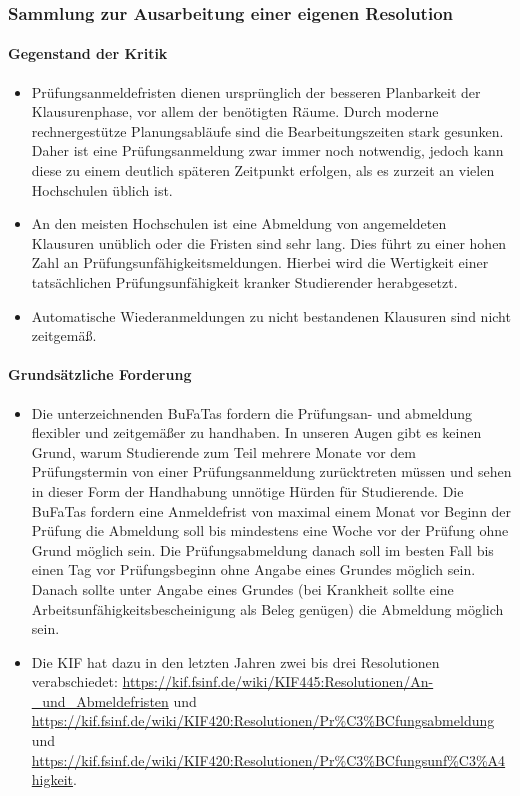     \subsubsection{Sammlung zur Ausarbeitung einer eigenen Resolution}
      \paragraph{Gegenstand der Kritik}
        \begin{itemize}
          \item Prüfungsanmeldefristen dienen ursprünglich der besseren Planbarkeit der Klausurenphase, vor allem der benötigten Räume. Durch moderne rechnergestütze Planungsabläufe sind die Bearbeitungszeiten stark gesunken. Daher ist eine Prüfungsanmeldung zwar immer noch notwendig, jedoch kann diese zu einem deutlich späteren Zeitpunkt erfolgen, als es zurzeit an vielen Hochschulen üblich ist. \\
          \item An den meisten Hochschulen ist eine Abmeldung von angemeldeten Klausuren unüblich oder die Fristen sind sehr lang. Dies führt zu einer hohen Zahl an Prüfungsunfähigkeitsmeldungen. Hierbei wird die Wertigkeit einer tatsächlichen Prüfungsunfähigkeit kranker Studierender herabgesetzt. \\
          \item Automatische Wiederanmeldungen zu nicht bestandenen Klausuren sind nicht zeitgemäß.
        \end{itemize}

      \paragraph{Grundsätzliche Forderung}
        \begin{itemize}
          \item Die unterzeichnenden BuFaTas fordern die Prüfungsan- und abmeldung flexibler und zeitgemäßer zu handhaben. In unseren Augen gibt es keinen Grund, warum Studierende zum Teil mehrere Monate vor dem Prüfungstermin von einer Prüfungsanmeldung zurücktreten müssen und sehen in dieser Form der Handhabung unnötige Hürden für Studierende. Die BuFaTas fordern eine Anmeldefrist von maximal einem Monat vor Beginn der Prüfung die Abmeldung soll bis mindestens eine Woche vor der Prüfung ohne Grund möglich sein. Die Prüfungsabmeldung danach soll im besten Fall bis einen Tag vor Prüfungsbeginn ohne Angabe eines Grundes möglich sein. Danach sollte unter Angabe eines Grundes (bei Krankheit sollte eine Arbeitsunfähigkeitsbescheinigung als Beleg genügen) die Abmeldung möglich sein.
          \item Die KIF hat dazu in den letzten Jahren zwei bis drei Resolutionen verabschiedet: \url{https://kif.fsinf.de/wiki/KIF445:Resolutionen/An-_und_Abmeldefristen} und \url{https://kif.fsinf.de/wiki/KIF420:Resolutionen/Pr%C3%BCfungsabmeldung} und \url{https://kif.fsinf.de/wiki/KIF420:Resolutionen/Pr%C3%BCfungsunf%C3%A4higkeit}.
        \end{itemize}

